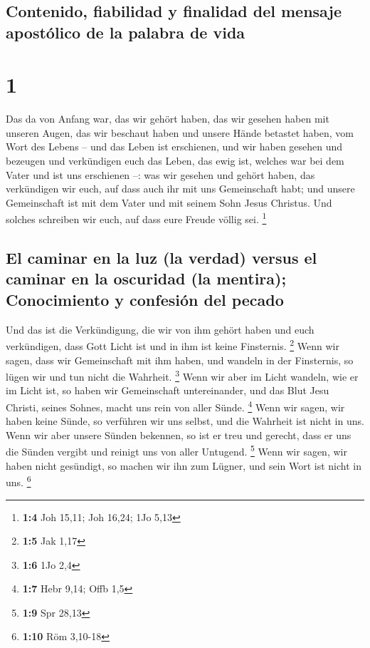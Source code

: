 \hypertarget{contenido-fiabilidad-y-finalidad-del-mensaje-apostuxf3lico-de-la-palabra-de-vida}{%
\subsection{Contenido, fiabilidad y finalidad del mensaje apostólico de
la palabra de
vida}\label{contenido-fiabilidad-y-finalidad-del-mensaje-apostuxf3lico-de-la-palabra-de-vida}}

\hypertarget{section}{%
\section{1}\label{section}}

 Das da von Anfang war, das wir gehört haben, das wir
gesehen haben mit unseren Augen, das wir beschaut haben und unsere Hände
betastet haben, vom Wort des Lebens --  und das Leben ist
erschienen, und wir haben gesehen und bezeugen und verkündigen euch das
Leben, das ewig ist, welches war bei dem Vater und ist uns erschienen
--:  was wir gesehen und gehört haben, das verkündigen wir
euch, auf dass auch ihr mit uns Gemeinschaft habt; und unsere
Gemeinschaft ist mit dem Vater und mit seinem Sohn Jesus Christus.
 Und solches schreiben wir euch, auf dass eure Freude
völlig sei. \footnote{\textbf{1:4} Joh 15,11; Joh 16,24; 1Jo 5,13}

\hypertarget{el-caminar-en-la-luz-la-verdad-versus-el-caminar-en-la-oscuridad-la-mentira-conocimiento-y-confesiuxf3n-del-pecado}{%
\subsection{El caminar en la luz (la verdad) versus el caminar en la
oscuridad (la mentira); Conocimiento y confesión del
pecado}\label{el-caminar-en-la-luz-la-verdad-versus-el-caminar-en-la-oscuridad-la-mentira-conocimiento-y-confesiuxf3n-del-pecado}}

 Und das ist die Verkündigung, die wir von ihm gehört
haben und euch verkündigen, dass Gott Licht ist und in ihm ist keine
Finsternis. \footnote{\textbf{1:5} Jak 1,17}  Wenn wir
sagen, dass wir Gemeinschaft mit ihm haben, und wandeln in der
Finsternis, so lügen wir und tun nicht die Wahrheit. \footnote{\textbf{1:6}
  1Jo 2,4}  Wenn wir aber im Licht wandeln, wie er im
Licht ist, so haben wir Gemeinschaft untereinander, und das Blut Jesu
Christi, seines Sohnes, macht uns rein von aller Sünde. \footnote{\textbf{1:7}
  Hebr 9,14; Offb 1,5}  Wenn wir sagen, wir haben keine
Sünde, so verführen wir uns selbst, und die Wahrheit ist nicht in uns.
 Wenn wir aber unsere Sünden bekennen, so ist er treu und
gerecht, dass er uns die Sünden vergibt und reinigt uns von aller
Untugend. \footnote{\textbf{1:9} Spr 28,13}  Wenn wir
sagen, wir haben nicht gesündigt, so machen wir ihn zum Lügner, und sein
Wort ist nicht in uns. \footnote{\textbf{1:10} Röm 3,10-18}

